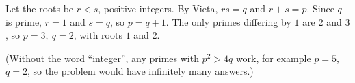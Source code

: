 Let the roots be $r<s$, positive integers. By Vieta, $rs=q$ and $r+s=p$. Since $q$ is prime, $r=1$ and $s=q$, so $p=q+1$. The only primes differing by $1$ are $2$ and $3$, so $\boxed{p=3,\ q=2}$, with roots $1$ and $2$.

(Without the word ``integer'', any primes with $p^2>4q$ work, for example $p=5$, $q=2$, so the problem would have infinitely many answers.)
